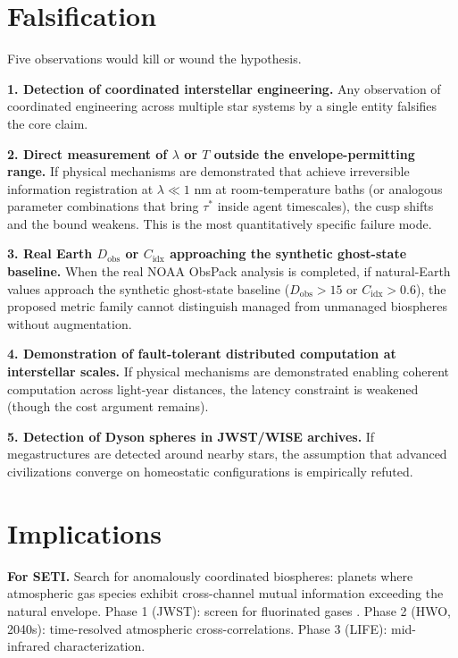 \documentclass[11pt,twocolumn]{article}
\newcommand{\taustar}{{\tau^{*}}}
\begin{document}
\section{Falsification}

Five observations would kill or wound the hypothesis.

\textbf{1. Detection of coordinated interstellar engineering.} Any
observation of coordinated engineering across multiple star systems by a
single entity falsifies the core claim.

\textbf{2. Direct measurement of $\lambda$ or $T$ outside the envelope-permitting range.}
If physical mechanisms are demonstrated that achieve irreversible
information registration at $\lambda \ll 1$ nm at room-temperature baths
(or analogous parameter combinations that bring $\taustar$ inside agent
timescales), the cusp shifts and the bound weakens. This is the most
quantitatively specific failure mode.

\textbf{3. Real Earth $D_{\text{obs}}$ or $C_{\text{idx}}$ approaching the synthetic ghost-state baseline.}
When the real NOAA ObsPack analysis is completed, if natural-Earth values
approach the synthetic ghost-state baseline ($D_{\text{obs}} > 15$ or
$C_{\text{idx}} > 0.6$), the proposed metric family cannot distinguish
managed from unmanaged biospheres without augmentation.

\textbf{4. Demonstration of fault-tolerant distributed computation at interstellar scales.}
If physical mechanisms are demonstrated enabling coherent computation
across light-year distances, the latency constraint is weakened (though
the cost argument remains).

\textbf{5. Detection of Dyson spheres in JWST/WISE archives.}
If megastructures are detected around nearby stars, the assumption that
advanced civilizations converge on homeostatic configurations is
empirically refuted.

\section{Implications}

\textbf{For SETI.} Search for anomalously coordinated biospheres: planets
where atmospheric gas species exhibit cross-channel mutual information
exceeding the natural envelope. Phase 1 (JWST): screen for fluorinated
gases \citep{Schwieterman2024}. Phase 2 (HWO, 2040s): time-resolved
atmospheric cross-correlations. Phase 3 (LIFE): mid-infrared
characterization.
\end{document}
